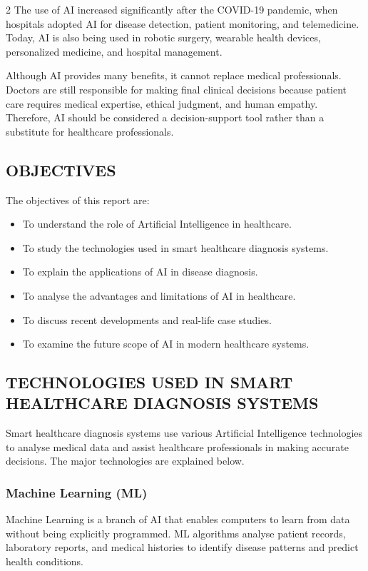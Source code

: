 \begin{multicols}{2}
  \noindent
  The use of AI increased significantly after the COVID-19 pandemic, when hospitals adopted AI for disease detection, patient monitoring, and telemedicine. Today, AI is also being used in robotic surgery, wearable health devices, personalized medicine, and hospital management.

  \noindent
  Although AI provides many benefits, it cannot replace medical professionals. Doctors are still responsible for making final clinical decisions because patient care requires medical expertise, ethical judgment, and human empathy. Therefore, AI should be considered a decision-support tool rather than a substitute for healthcare professionals.

  \subsection*{\centering\uppercase{Objectives}}
  The objectives of this report are:
  \begin{itemize}
    \item To understand the role of Artificial Intelligence in healthcare.
    \item  To study the technologies used in smart healthcare diagnosis systems.
    \item  To explain the applications of AI in disease diagnosis.
    \item  To analyse the advantages and limitations of AI in healthcare.
    \item  To discuss recent developments and real-life case studies.
    \item  To examine the future scope of AI in modern healthcare systems.

  \end{itemize}

  \subsection*{\centering\uppercase{Technologies Used in Smart Healthcare Diagnosis Systems}}
  Smart healthcare diagnosis systems use various Artificial Intelligence technologies to analyse medical data and assist healthcare professionals in making accurate decisions. The major technologies are explained below.

  \subsubsection*{Machine Learning (ML)}
  Machine Learning is a branch of AI that enables computers to learn from data without being explicitly programmed. ML algorithms analyse patient records, laboratory reports, and medical histories to identify disease patterns and predict health conditions.


\end{multicols}
